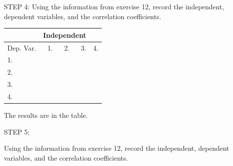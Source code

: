 \documentclass[11pt, chapterprefix=true]{scrbook}\usepackage[]{graphicx}\usepackage[]{color}
\begin{document}
\begin{exercises}
  \begin{exercise} %


    STEP 4: Using the information from exercise 12, record the independent, dependent variables, and the correlation coefficients.

     \begin{table}[ht]
     \centering
     {\tiny{
     \begin{tabular}{lrrrr} \hline
         &  \multicolumn{3}{c}{Independent} \\ \hline

     Dep. Var. & 1. \underline{\phantom{xxxx}} &
                 2. \underline{\phantom{xxxx}} &
                 3. \underline{\phantom{xxxx}} &
                 4. \underline{\phantom{xxxx}} \\ \hline
     1. \underline{\phantom{xxxx}}  &
     \underline{\phantom{xxxx}}  \\ \hline
     2. \underline{\phantom{xxxx}}  &
     \underline{\phantom{xxxx}} &
     \underline{\phantom{xxxx}}  \\ \hline
     3. \underline{\phantom{xxxx}}  &
     \underline{\phantom{xxxx}} &
     \underline{\phantom{xxxx}} &
     \underline{\phantom{xxxx}}  \\ \hline
     4. \underline{\phantom{xxxx}}  &
     \underline{\phantom{xxxx}} &
     \underline{\phantom{xxxx}} &
     \underline{\phantom{xxxx}} &
     \underline{\phantom{xxxx}}  \\ \hline
     \end{tabular}
     }}
     \end{table}


    \end{exercise}
    \vspace{2mm}
    \begin{solution}

      The results are in the table.

    \end{solution}

  \begin{exercise} %

    STEP 5:

    Using the information from exercise 12, record the independent, dependent variables, and the correlation coefficients.

    \vspace{5mm}


\end{exercise}
\end{exercises}
\end{document}
